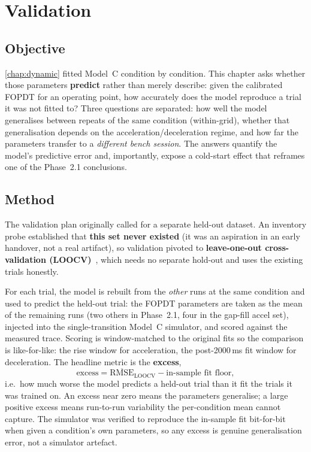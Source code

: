 \chapter{Validation}
\label{chap:validation}

\section{Objective}
\label{sec:val-obj}

\cref{chap:dynamic} fitted Model~C condition by condition. This chapter asks whether those parameters \textbf{predict} rather than merely describe: given the calibrated FOPDT for an operating point, how accurately does the model reproduce a trial it was not fitted to? Three questions are separated: how well the model generalises between repeats of the same condition (within-grid), whether that generalisation depends on the acceleration/deceleration regime, and how far the parameters transfer to a \emph{different bench session}. The answers quantify the model's predictive error and, importantly, expose a cold-start effect that reframes one of the Phase~2.1 conclusions.

\section{Method}
\label{sec:val-method}

The validation plan originally called for a separate held-out dataset. An inventory probe established that \textbf{this set never existed} (it was an aspiration in an early handover, not a real artifact), so validation pivoted to \textbf{leave-one-out cross-validation (LOOCV)}~\citep{hastie2009}, which needs no separate hold-out and uses the existing trials honestly.

For each trial, the model is rebuilt from the \emph{other} runs at the same condition and used to predict the held-out trial: the FOPDT parameters are taken as the mean of the remaining runs (two others in Phase~2.1, four in the gap-fill accel set), injected into the single-transition Model~C simulator, and scored against the measured trace. Scoring is window-matched to the original fits so the comparison is like-for-like: the rise window for acceleration, the post-2000\,ms fit window for deceleration. The headline metric is the \textbf{excess},
\begin{equation}
  \text{excess} = \overline{\mathrm{RMSE}}_{\mathrm{LOOCV}} - \text{in-sample fit floor},
  \label{eq:excess}
\end{equation}
i.e.\ how much worse the model predicts a held-out trial than it fit the trials it was trained on. An excess near zero means the parameters generalise; a large positive excess means run-to-run variability the per-condition mean cannot capture. The simulator was verified to reproduce the in-sample fit bit-for-bit when given a condition's own parameters, so any excess is genuine generalisation error, not a simulator artefact.

